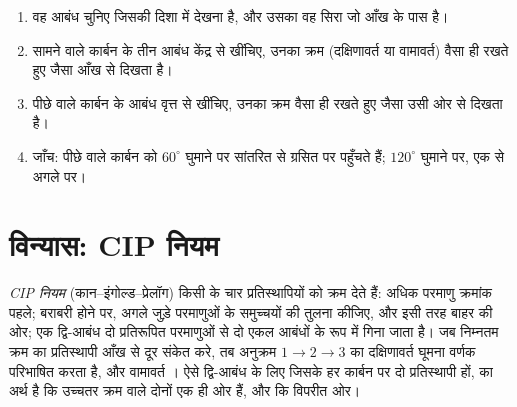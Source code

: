 \begin{method}[क्रैम से न्यूमैन तक]\label{met:b1:stereochemistry-in-depth:newman-from-cram}
\begin{enumerate}
  \item वह आबंध चुनिए जिसकी दिशा में देखना है, और उसका वह सिरा जो आँख के पास है।
  \item सामने वाले कार्बन के तीन आबंध केंद्र से खींचिए,
        उनका क्रम (दक्षिणावर्त या वामावर्त) वैसा ही रखते हुए जैसा
        आँख से दिखता है।
  \item पीछे वाले कार्बन के आबंध वृत्त से खींचिए, उनका क्रम वैसा ही रखते हुए जैसा
        उसी ओर से दिखता है।
  \item जाँच: पीछे वाले कार्बन को $60^\circ$ घुमाने पर
        सांतरित से ग्रसित पर पहुँचते हैं; $120^\circ$ घुमाने पर, एक  से अगले पर।
\end{enumerate}
\end{method}

\section{विन्यास: CIP नियम}

\begin{definition}[CIP नियम, वर्णक]\label{def:b1:stereochemistry-in-depth:cip}
\emph{CIP नियम} (कान--इंगोल्ड--प्रेलॉग) किसी  के
चार प्रतिस्थापियों को क्रम देते हैं: अधिक परमाणु क्रमांक पहले; बराबरी
होने पर, अगले जुड़े परमाणुओं के समुच्चयों की तुलना कीजिए, और इसी तरह बाहर की ओर; एक
द्वि-आबंध दो प्रतिरूपित परमाणुओं से दो एकल आबंधों के रूप में गिना जाता है। जब
निम्नतम क्रम का प्रतिस्थापी आँख से दूर संकेत करे, तब अनुक्रम
$1 \to 2 \to 3$ का दक्षिणावर्त घूमना वर्णक  परिभाषित करता है, और
वामावर्त । ऐसे द्वि-आबंध के लिए जिसके हर कार्बन पर दो प्रतिस्थापी हों,
 का अर्थ है कि उच्चतर क्रम वाले दोनों एक ही ओर हैं, और
 कि विपरीत ओर।
\end{definition}

